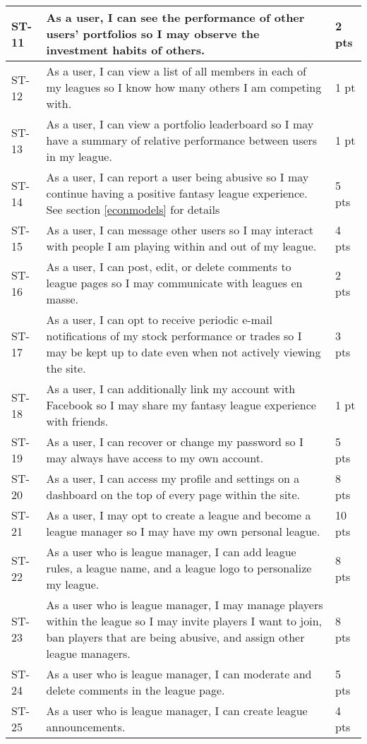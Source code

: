 \begin{longtable}{|p{0.6in}|p{4.6in}|p{0.5in}|}
ST-11&As a user, I can see the performance of other users' portfolios so I may observe the investment habits of others.&2 pts  \\ \hline 
ST-12&As a user, I can view a list of all members in each of my leagues so I know how many others I am competing with.&1 pt   \\ \hline 
ST-13&As a user, I can view a portfolio leaderboard so I may have a summary of relative performance between users in my league.&1 pt   \\ \hline 
ST-14&As a user, I can report a user being abusive so I may continue having a positive fantasy league experience. See section \ref{econmodels} for details&5 pts  \\ \hline 
ST-15&As a user, I can message other users so I may interact with people I am playing within and out of my league.&4 pts  \\ \hline 
ST-16&As a user, I can post, edit, or delete comments to league pages so I may communicate with leagues en masse.&2 pts  \\ \hline 
ST-17&As a user, I can opt to receive periodic e-mail notifications of my stock performance or trades so I may be kept up to date even when not actively viewing the site.&3 pts  \\ \hline 
ST-18&As a user, I can additionally link my account with Facebook so I may share my fantasy league experience with friends.&1 pt   \\ \hline 
ST-19&As a user, I can recover or change my password so I may always have access to my own account.&5 pts  \\ \hline 
ST-20&As a user, I can access my profile and settings on a dashboard on the top of every page within the site.&8 pts  \\ \hline 
ST-21&As a user, I may opt to create a league and become a league manager so I may have my own personal league.&10 pts \\ \hline 
ST-22&As a user who is league manager, I can add league rules, a league name, and a league logo to personalize my league.&8 pts  \\ \hline 
ST-23&As a user who is league manager, I may manage players within the league so I may invite players I want to join, ban players that are being abusive, and assign other league managers.&8 pts  \\ \hline 
ST-24&As a user who is league manager, I can moderate and delete comments in the league page.&5 pts  \\ \hline 
ST-25&As a user who is league manager, I can create league announcements.&4 pts  \\ \hline 

\end{longtable}
